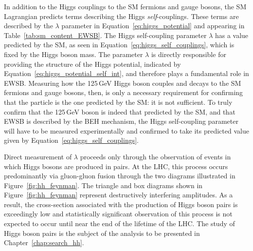 In addition to the Higgs couplings to the SM fermions and gauge bosons, the SM Lagrangian
predicts terms describing the Higgs \textit{self}-couplings.
These terms are described by the $\lambda$ parameter in Equation~\ref{eq:higgs_potential}
and appearing in Table~\ref{tab:sm_content_EWSB}.
The Higgs self-coupling parameter $\lambda$ has a value predicted by the SM, as seen in 
Equation~\ref{eq:higgs_self_couplings}, which is fixed by the Higgs boson mass.
The parameter $\lambda$ is directly responsible for providing the structure of the Higgs potential,
indicated by Equation~\ref{eq:higgs_potential_self_int}, and therefore plays a fundamental
role in EWSB.
Measuring how the 125\,GeV Higgs boson couples and decays to the SM fermions and gauge bosons,
then, is only a necessary requirement for confirming that the particle is the one predicted by
the SM: it is not sufficient.
To truly confirm that the 125\,GeV boson is indeed that predicted by the SM, and that EWSB
is described by the BEH mechanism, the Higgs self-coupling parameter will have to be measured
experimentally and confirmed to take its predicted value given by Equation~\ref{eq:higgs_self_couplings}.

Direct measurement of $\lambda$ proceeds only through the observation of events in which Higgs bosons
are produced in pairs.
At the LHC, this process occurs predominantly via gluon-gluon fusion through the two diagrams illustrated
in Figure~\ref{fig:hh_feynman}.
The triangle and box diagrams shown in Figure~\ref{fig:hh_feynman} represent destructively interfering amplitudes.
As a result, the cross-section associated with the production of Higgs boson pairs is exceedingly low
and statistically significant observation of this process is not expected to occur until
near the end of the lifetime of the LHC.
The study of Higgs boson pairs is the subject of the analysis to be presented in Chapter~\ref{chap:search_hh}.

